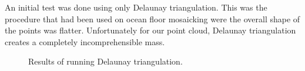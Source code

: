 An initial test was done using only Delaunay triangulation. This was the procedure that had been used on ocean floor mosaicking were the overall shape of the points was flatter. Unfortunately for our point cloud, Delaunay triangulation creates a completely incomprehensible mass. 

\begin{figure}[h]
	\centering
	\caption{Results of running Delaunay triangulation.}
	\label{fig:deltri}
\end{figure}

